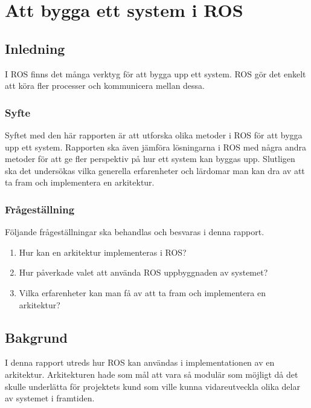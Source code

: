 \chapter{Att bygga ett system i ROS}
\label{cha:indiv-report-lundberg}

\section{Inledning}
\label{sec:introduction-lundberg}

I ROS finns det många verktyg för att bygga upp ett system. ROS gör det enkelt att köra fler processer och kommunicera mellan dessa.

\subsection{Syfte}
\label{sec:purpose-lundberg}

Syftet med den här rapporten är att utforska olika metoder i ROS för att bygga upp ett system. Rapporten ska även jämföra lösningarna i ROS med några andra metoder för att ge fler perspektiv på hur ett system kan byggas upp. Slutligen ska det undersökas vilka generella erfarenheter och lärdomar man kan dra av att ta fram och implementera en arkitektur.

\subsection{Frågeställning}
\label{sec:issue-lundberg}

Följande frågeställningar ska behandlas och besvaras i denna rapport.

\begin{enumerate}
	\item Hur kan en arkitektur implementeras i ROS?
	
	\item Hur påverkade valet att använda ROS uppbyggnaden av systemet?
	
	\item Vilka erfarenheter kan man få av att ta fram och implementera en arkitektur?
\end{enumerate}


\section{Bakgrund}
\label{sec:background-lundberg}

I denna rapport utreds hur ROS kan användas i implementationen av en arkitektur. Arkitekturen hade som mål att vara så modulär som möjligt då det skulle underlätta för projektets kund som ville kunna vidareutveckla olika delar av systemet i framtiden.

